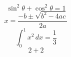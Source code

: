\documentclass[a4paper,12pt]{article}%
\begin{document}
$$\sin^2\theta+\cos^2\theta=1$$
$$x=\frac{-b\pm\sqrt{b^2-4ac}}{2a}$$
$$\int_0^1 x^2\,dx=\frac{1}{3}$$
$$2+2$$
\end{document}
